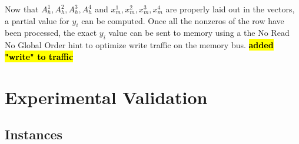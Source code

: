 \documentclass[10pt,conference,compsocconf]{IEEEtran}
\newcommand{\todo}[1]{{\color{red}\textbf{\hl{#1}}\xspace}}
\begin{document}
Now that $A_h^1,A_h^2,A_h^3,A_h^4$ and $x_m^1,x_m^2,x_m^3,x_m^4$ are
properly laid out in the vectors, a partial value for $y_i$ can be
computed. Once all the nonzeros of the row have been processed, the
exact $y_i$ value can be sent to memory using a the No Read No Global
Order hint to optimize write traffic on the memory bus.
\todo{ added "write" to traffic }


\section{Experimental Validation}
\label{sec:expe}

\subsection{Instances}
\end{document}
